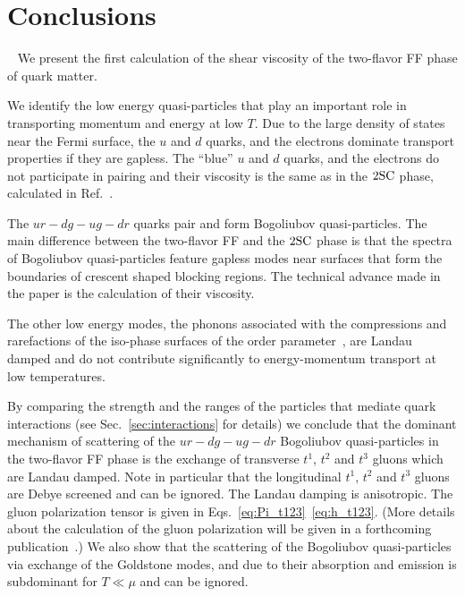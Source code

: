 \documentclass[10pt, aps, prd, superscriptaddress, nofootinbib, 
               amsmath, amssymb, twocolumn,
               preprintnumbers, showpacs,
               raggedbottom,
               floatfix]{revtex4-1}
\newcommand{\SC}{{\rm{SC}}}
\begin{document}
\section{Conclusions}
~\label{sec:conclusions}
We present the first calculation of the shear viscosity of the two-flavor FF
phase of quark matter. 

We identify the low energy quasi-particles that play an important role in
transporting momentum and energy at low $T$. Due to the large density of states
near the Fermi surface, the $u$ and $d$ quarks, and the electrons dominate
transport properties if they are gapless. The ``blue'' $u$ and $d$ quarks, and
the electrons do not participate in pairing and their viscosity is the same as
in the $2\SC$ phase, calculated in Ref.~\cite{Alford:2014doa}.

The $ur-dg-ug-dr$ quarks pair and form Bogoliubov quasi-particles. The main
difference between the two-flavor FF and the $2\SC$ phase is that the spectra of
Bogoliubov quasi-particles feature gapless modes near surfaces that form the boundaries of
crescent shaped blocking regions. The technical advance made in the paper is
the calculation of their viscosity. 

The other low energy modes, the phonons associated with the compressions and
rarefactions of the iso-phase surfaces of the order
parameter~\cite{Mannarelli:2007bs}, are Landau
damped and do not contribute significantly to energy-momentum transport at low
temperatures.

By comparing the strength and the ranges of the particles that mediate quark
interactions (see Sec.~\ref{sec:interactions} for details) we conclude that the
dominant mechanism of scattering of the $ur-dg-ug-dr$ Bogoliubov
quasi-particles in the two-flavor FF phase is the exchange of transverse $t^1$,
$t^2$ and $t^3$ gluons which are Landau damped. Note in particular that the
longitudinal $t^1$, $t^2$ and $t^3$ gluons are Debye screened and can be
ignored. The Landau damping is anisotropic. The gluon polarization tensor is
given in Eqs.~\ref{eq:Pi_t123}~\ref{eq:h_t123}.  (More details about the
calculation of the gluon polarization will be given in a forthcoming
publication~\cite{InPreparation}.) We also show that the scattering of the
Bogoliubov quasi-particles via exchange of the Goldstone modes, and
due to their absorption and emission is subdominant for $T\ll \mu$ and can
be ignored.
\end{document}
